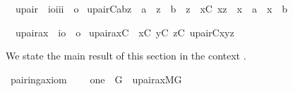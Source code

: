 \begin{isabelle}
\isamarkupfalse%
\isanewline
\ \ upair\ {\isacharcolon}{\isacharcolon}\ {\isachardoublequoteopen}{\isacharbrackleft}i{\isasymRightarrow}o{\isacharcomma}i{\isacharcomma}i{\isacharcomma}i{\isacharbrackright}\ {\isasymRightarrow}\ o{\isachardoublequoteclose}\ \isanewline
 {\isachardoublequoteopen}upair{\isacharparenleft}C{\isacharcomma}a{\isacharcomma}b{\isacharcomma}z{\isacharparenright}\ {\isacharequal}{\isacharequal}\ a\ {\isasymin}\ z\ {\isasymand}\ b\ {\isasymin}\ z\ {\isasymand}\ {\isacharparenleft}{\isasymforall}x{\isacharbrackleft}C{\isacharbrackright}{\isachardot}\ x{\isasymin}z\ {\isasymlongrightarrow}\ x\ {\isacharequal}\ a\ {\isasymor}\ x\ {\isacharequal}\ b{\isacharparenright}{\isachardoublequoteclose}
\end{isabelle}
%
%
\begin{isabelle}
\isamarkupfalse%
\isanewline
\ \ upair{\isacharunderscore}ax\ {\isacharcolon}{\isacharcolon}\ {\isachardoublequoteopen}{\isacharparenleft}i{\isasymRightarrow}o{\isacharparenright}\ {\isasymRightarrow}\ o{\isachardoublequoteclose}\ \isanewline
 {\isachardoublequoteopen}upair{\isacharunderscore}ax{\isacharparenleft}C{\isacharparenright}\ {\isacharequal}{\isacharequal}\ {\isasymforall}x{\isacharbrackleft}C{\isacharbrackright}{\isachardot}\ {\isasymforall}y{\isacharbrackleft}C{\isacharbrackright}{\isachardot}\ {\isasymexists}z{\isacharbrackleft}C{\isacharbrackright}{\isachardot}\ upair{\isacharparenleft}C{\isacharcomma}x{\isacharcomma}y{\isacharcomma}z{\isacharparenright}{\isachardoublequoteclose}
\end{isabelle}



We state the main result of this section in the context
.
%
\begin{isabelle}
\isamarkupfalse%
\ pairing{\isacharunderscore}axiom\ {\isacharcolon}\ \isanewline
\ \ {\isachardoublequoteopen}one\ {\isasymin}\ G\ {\isasymLongrightarrow}\ upair{\isacharunderscore}ax{\isacharparenleft}{\isacharhash}{\isacharhash}M{\isacharbrackleft}G{\isacharbrackright}{\isacharparenright}{\isachardoublequoteclose}
\end{isabelle}

